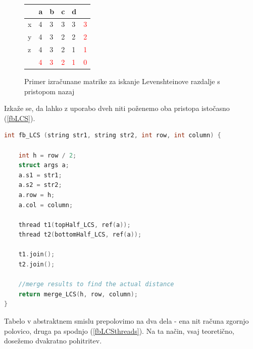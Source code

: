 \documentclass[a4paper,12pt,openright]{book}
\begin{document}
\begin{figure}[htb]
\begin{center}
\begin{tabular}{|l|l|l|l|l|l|}
\cline{2-5}
  \multicolumn{1}{c|}{}  & a & b & c & d\\ \hline
x & \cellcolor{blue!25}4 & \cellcolor{blue!15}3 & 3 & 3 & \textcolor{red}{3}\\ \hline
y  & 4 & 3 &  \cellcolor{blue!15}2 & 2 & \textcolor{red}{2}\\ \hline
z  & 4 & 3 & 2 & \cellcolor{blue!15}1 & \textcolor{red}{1} \\ \hline
\multicolumn{1}{c|}{}  & \textcolor{red}{4} & \textcolor{red}{3} & \textcolor{red}{2} & \textcolor{red}{1} & \textcolor{red}{0} \\ \cline{2-6}
\end{tabular}

\end{center}
\caption{Primer izračunane matrike za iskanje Levenshteinove razdalje s pristopom nazaj}
\label{levenshteinBackwardExample}
\end{figure}


Izkaže se, da lahko z uporabo dveh niti poženemo oba pristopa istočasno (\ref{fbLCS}). 

\bigskip
\begin{lstlisting}[language=C++, caption={Algoritem LCS naprej-nazaj}, captionpos=b, label=fbLCS]
int fb_LCS (string str1, string str2, int row, int column) {

    int h = row / 2;
    struct args a; 
    a.s1 = str1;
    a.s2 = str2;
    a.row = h;
    a.col = column;

    thread t1(topHalf_LCS, ref(a));
    thread t2(bottomHalf_LCS, ref(a));
    
    t1.join();
    t2.join();

    //merge results to find the actual distance
    return merge_LCS(h, row, column);
}
\end{lstlisting}

Tabelo v abstraktnem smislu prepolovimo na dva dela - ena nit računa zgornjo polovico, druga pa spodnjo (\ref{fbLCSthreads}). Na ta način, vsaj teoretično, dosežemo dvakratno pohitritev. 
\end{document}
